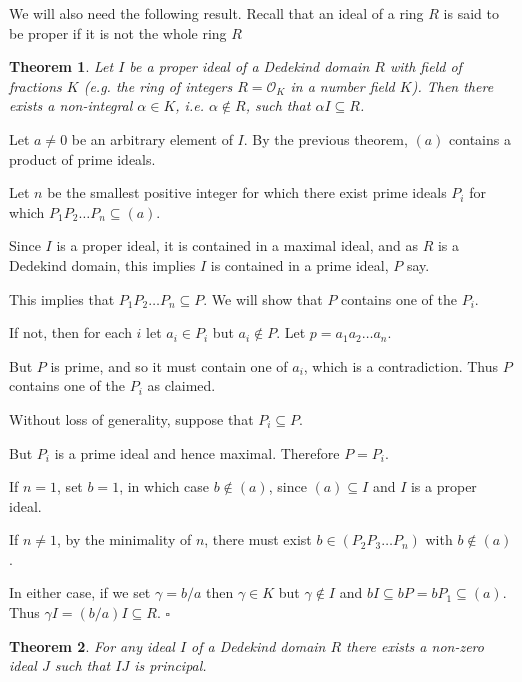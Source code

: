 \documentclass[10pt]{article}
\newcommand{\qed}{\square}
\newtheorem{theorem}{Theorem}[section]
\newenvironment{proof}[1][Proof]{\begin{trivlist}
\item[\hskip \labelsep {\bfseries #1}]}{\end{trivlist}}
\begin{document}
We will also need the following result. Recall that an ideal of a ring $R$ is said to be proper if it is not the whole ring $R$

\begin{theorem}
Let $I$ be a proper ideal of a Dedekind domain $R$ with field of fractions $K$ (e.g. the ring of integers $R = \mathcal{O}_K$ in a number field $K$). Then there exists a non-integral $\alpha \in K$, i.e. $\alpha \notin R$, such that $\alpha I \subseteq R$.
\end{theorem}

\begin{proof}
Let $a \neq 0$ be an arbitrary element of $I$. By the previous theorem, $(a)$ contains a product of prime ideals.

Let $n$ be the smallest positive integer for which there exist prime ideals $P_i$ for which $P_1P_2\ldots P_n \subseteq (a)$.

Since $I$ is a proper ideal, it is contained in a maximal ideal, and as $R$ is a Dedekind domain, this implies $I$ is contained in a prime ideal, $P$ say.

This implies that $P_1P_2\ldots P_n \subseteq P$. We will show that $P$ contains one of the $P_i$.

If not, then for each $i$ let $a_i \in P_i$ but $a_i \notin P$. Let $p = a_1a_2\ldots a_n$.

But $P$ is prime, and so it must contain one of $a_i$, which is a contradiction. Thus $P$ contains one of the $P_i$ as claimed.

Without loss of generality, suppose that $P_i \subseteq P$.

But $P_i$ is a prime ideal and hence maximal. Therefore $P = P_i$.

If $n = 1$, set $b = 1$, in which case $b \notin (a)$, since $(a) \subseteq I$ and $I$ is a proper ideal. 

If $n \neq 1$, by the minimality of $n$, there must exist $b \in (P_2P_3\ldots P_n)$ with $b \notin (a)$.

In either case, if we set $\gamma = b/a$ then $\gamma \in K$ but $\gamma \notin I$ and $bI \subseteq bP = bP_1 \subseteq (a)$. Thus $\gamma I = (b/a)I \subseteq R$. $\qed$
\end{proof}

\begin{theorem}\label{princ}
For any ideal $I$ of a Dedekind domain $R$ there exists a non-zero ideal $J$ such that $IJ$ is principal.
\end{theorem}
\end{document}
